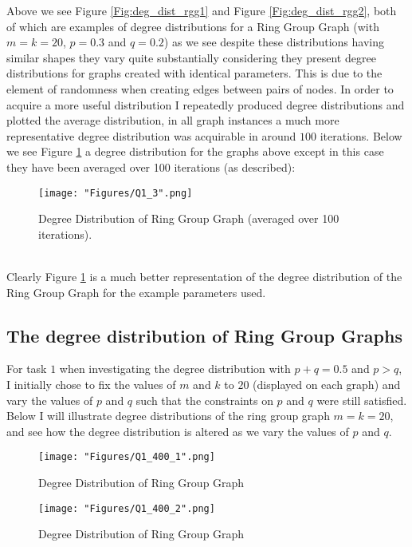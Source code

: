 \documentclass[12pt, a4paper]{article}
\begin{document}
\newpage
Above we see Figure \ref{Fig:deg_dist_rgg1} and Figure \ref{Fig:deg_dist_rgg2}, both of which are examples of degree distributions for a Ring Group Graph (with $m = k = 20$, $p = 0.3$ and $q=0.2$) as we see despite these distributions having similar shapes they vary quite substantially considering they present degree distributions for graphs created with identical parameters. This is due to the element of randomness when creating edges between pairs of nodes. In order to acquire a more useful distribution I repeatedly produced degree distributions and plotted the average distribution, in all graph instances a much more representative degree distribution was acquirable in around $100$ iterations. Below we see Figure \ref{Fig:deg_dist_rgg3} a degree distribution  for the graphs above except in this case they have been averaged over 100 iterations (as described):
\begin{figure}[!htb]
     \centering
     \texttt{[image: "Figures/Q1\_3".png]}
     \caption{Degree Distribution of Ring Group Graph (averaged over 100 iterations).}
     \label{Fig:deg_dist_rgg3}
\end{figure}\\
Clearly Figure \ref{Fig:deg_dist_rgg3}  is a much better representation of the degree distribution of the Ring Group Graph for the example parameters used.

\subsection*{The degree distribution of Ring Group Graphs}
For task $1$ when investigating the degree distribution with $p+q =0.5$ and $p>q$, I initially chose to fix the values of $m$ and $k$ to $20$ (displayed on each graph) and vary the values of $p$ and $q$ such that the constraints on $p$ and $q$ were still satisfied. Below I will illustrate degree distributions of the ring group graph $m=k=20$, and see how the degree distribution is altered as we vary the values of $p$ and $q$.
\begin{figure}[!htb]
   \begin{minipage}{0.49\textwidth}
     \centering
     \texttt{[image: "Figures/Q1\_400\_1".png]}
     \caption{Degree Distribution of Ring Group Graph}
     \label{Fig:deg_dist_rgg4}
   \end{minipage}\hfill
   \begin{minipage}{0.49\textwidth}
     \centering
     \texttt{[image: "Figures/Q1\_400\_2".png]}
     \caption{Degree Distribution of Ring Group Graph}
     \label{Fig:deg_dist_rgg5}
   \end{minipage}
\end{figure}
\end{document}
